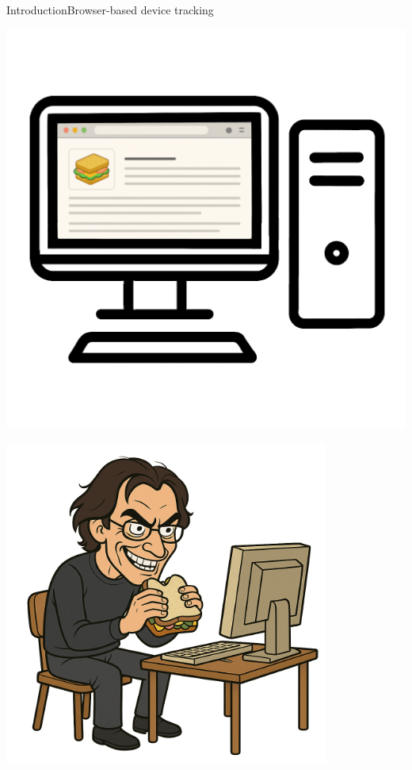 \documentclass[aspectratio=169, hyperref={colorlinks=true, allcolors=SecondaryColor}, c]{beamer}
\begin{document}
	\begin{frame}[fragile]{Introduction}{Browser-based device tracking}
		\begin{transformation}
			\begin{adjustbox}{scale=1}
				\begin{minipage}{1\textwidth}
					\includegraphics[width=1\textwidth]{./figures/computer_alpha_screen_2_website.png}
				\end{minipage}
			\end{adjustbox}
			\begin{adjustbox}{scale=1}
				\begin{minipage}{1\textwidth}
					\includegraphics[width=0.8\textwidth]{./figures/evil_computer_scientist_alpha.png}

\end{minipage}
\end{adjustbox}
\end{transformation}
\end{frame}
\end{document}
